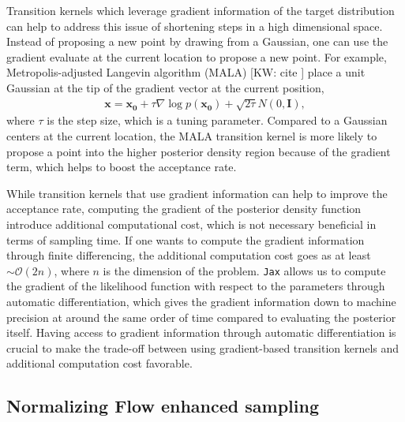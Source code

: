 \documentclass[twocolumn]{aastex631}
\newcommand{\kw}[1]{{\color{rb4}[KW: #1 ]}}
\begin{document}
Transition kernels which leverage gradient information of the target
distribution can help to address this issue of shortening steps in a high
dimensional space. Instead of proposing a new point by drawing from a Gaussian,
one can use the gradient evaluate at the current location to propose a new
point. For example, Metropolis-adjusted Langevin algorithm (MALA) \kw{cite}
place a unit Gaussian at the tip of the gradient vector at the current position,
\begin{align}
    \mathbf{x} = \mathbf{x_0} + \tau \nabla\log{p(\mathbf{x_0})} + \sqrt{2\tau}N(0,\mathbf{I}),
\end{align}
where $\tau$ is the step size, which is a tuning parameter. Compared to a
Gaussian centers at the current location, the MALA transition kernel is more
likely to propose a point into the higher posterior density region because of
the gradient term, which helps to boost the acceptance rate.

While transition kernels that use gradient information can help to improve the
acceptance rate, computing the gradient of the posterior density function
introduce additional computational cost, which is not necessary beneficial in
terms of sampling time. If one wants to compute the gradient information through
finite differencing, the additional computation cost goes as at least $\sim
\mathcal{O}(2n)$, where $n$ is the dimension of the problem. \texttt{Jax} allows
us to compute the gradient of the likelihood function with respect to the
parameters through automatic differentiation, which gives the gradient
information down to machine precision at around the same order of time compared
to evaluating the posterior itself. Having access to gradient information
through automatic differentiation is crucial to make the trade-off between using
gradient-based transition kernels and additional computation cost favorable.

\subsection{Normalizing Flow enhanced sampling}
\label{sec:flow}
\end{document}
